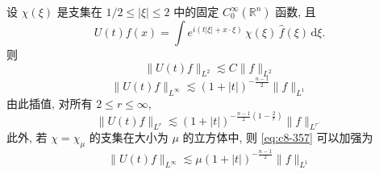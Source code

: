 \begin{proposition}\label{prop:c8-0.40}
设 $\chi(\xi)$ 是支集在 $1/2\leq|\xi|\leq2$ 中的固定 $C_0^{\infty}(\mathbb{R}^n)$ 函数, 且
\begin{equation}
U(t)f(x)=\int e^{i(t|\xi|+x\cdot\xi)}\, \chi(\xi)\, \widehat{f}(\xi)\, \mathrm{d}\xi .\label{eq:c8-355}
\end{equation}
则
\begin{equation}
\|U(t)f\|_{L^2}\lesssim C\|f\|_{L^2}\label{eq:c8-356}
\end{equation}
\begin{equation}
\|U(t)f\|_{L^\infty}\lesssim(1+|t|)^{-\frac{n-1}{2}}\|f\|_{L^1}\label{eq:c8-357}
\end{equation}
由此插值, 对所有 $2\leq r\leq\infty$, 
\begin{equation}
\|U(t)f\|_{L^r}\lesssim(1+|t|)^{-\frac{n-1}{2}\left(1-\frac{2}{r}\right)}\|f\|_{L^{r'}}\label{eq:c8-358}
\end{equation}
此外, 若 $\chi=\chi_{\mu}$ 的支集在大小为 $\mu$ 的立方体中, 则 \eqref{eq:c8-357} 可以加强为
\begin{equation}
\|U(t)f\|_{L^\infty}\lesssim\mu(1+|t|)^{-\frac{n-1}{2}}\|f\|_{L^1}\label{eq:c8-359}
\end{equation}
\end{proposition}

